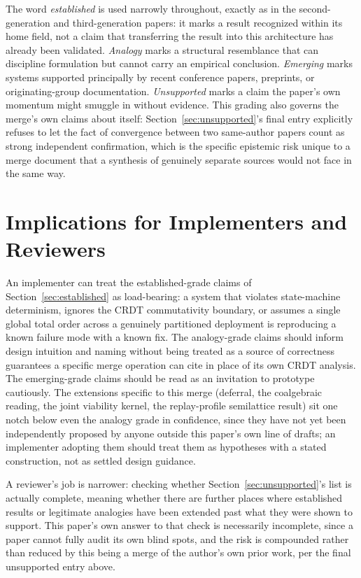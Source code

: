 \documentclass[11pt]{article}
\begin{document}
The word \emph{established} is used narrowly throughout, exactly as in the second-generation and third-generation papers: it marks a result recognized within its home field, not a claim that transferring the result into this architecture has already been validated. \emph{Analogy} marks a structural resemblance that can discipline formulation but cannot carry an empirical conclusion. \emph{Emerging} marks systems supported principally by recent conference papers, preprints, or originating-group documentation. \emph{Unsupported} marks a claim the paper's own momentum might smuggle in without evidence. This grading also governs the merge's own claims about itself: Section~\ref{sec:unsupported}'s final entry explicitly refuses to let the fact of convergence between two same-author papers count as strong independent confirmation, which is the specific epistemic risk unique to a merge document that a synthesis of genuinely separate sources would not face in the same way.

\section{Implications for Implementers and Reviewers}
\label{sec:implications}

An implementer can treat the established-grade claims of Section~\ref{sec:established} as load-bearing: a system that violates state-machine determinism, ignores the CRDT commutativity boundary, or assumes a single global total order across a genuinely partitioned deployment is reproducing a known failure mode with a known fix. The analogy-grade claims should inform design intuition and naming without being treated as a source of correctness guarantees a specific merge operation can cite in place of its own CRDT analysis. The emerging-grade claims should be read as an invitation to prototype cautiously. The extensions specific to this merge (deferral, the coalgebraic reading, the joint viability kernel, the replay-profile semilattice result) sit one notch below even the analogy grade in confidence, since they have not yet been independently proposed by anyone outside this paper's own line of drafts; an implementer adopting them should treat them as hypotheses with a stated construction, not as settled design guidance.

A reviewer's job is narrower: checking whether Section~\ref{sec:unsupported}'s list is actually complete, meaning whether there are further places where established results or legitimate analogies have been extended past what they were shown to support. This paper's own answer to that check is necessarily incomplete, since a paper cannot fully audit its own blind spots, and the risk is compounded rather than reduced by this being a merge of the author's own prior work, per the final unsupported entry above.
\end{document}
